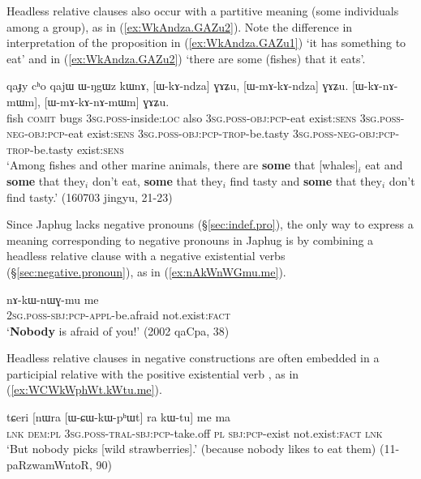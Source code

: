 Headless relative clauses also occur with a partitive meaning (some individuals among a group), as in (\ref{ex:WkAndza.GAZu2}). Note the difference in interpretation of the proposition  in (\ref{ex:WkAndza.GAZu1}) `it has something to eat' and in (\ref{ex:WkAndza.GAZu2}) `there are some (fishes) that it eats'.

\begin{exe}
\ex \label{ex:WkAndza.GAZu2}
\gll qaɟy cʰo qajɯ ɯ-ŋgɯz kɯnɤ, [ɯ-kɤ-ndza] ɣɤʑu, [ɯ-mɤ-kɤ-ndza] ɣɤʑu. [ɯ-kɤ-nɤ-mɯm], [ɯ-mɤ-kɤ-nɤ-mɯm] ɣɤʑu. \\
fish \textsc{comit} bugs \textsc{3sg}.\textsc{poss}-inside:\textsc{loc} also \textsc{3sg}.\textsc{poss}-\textsc{obj}:\textsc{pcp}-eat exist:\textsc{sens}  \textsc{3sg}.\textsc{poss}-\textsc{neg}-\textsc{obj}:\textsc{pcp}-eat exist:\textsc{sens} \textsc{3sg}.\textsc{poss}-\textsc{obj}:\textsc{pcp}-\textsc{trop}-be.tasty \textsc{3sg}.\textsc{poss}-\textsc{neg}-\textsc{obj}:\textsc{pcp}-\textsc{trop}-be.tasty exist:\textsc{sens}  \\
\glt `Among fishes and other marine animals, there are \textbf{some} that [whales]$_i$ eat and \textbf{some} that they$_i$ don't eat, \textbf{some} that they$_i$ find tasty and \textbf{some} that they$_i$ don't find tasty.' (160703 jingyu, 21-23)
\end{exe}

Since Japhug lacks negative pronouns (§\ref{sec:indef.pro}), the only way to express a meaning corresponding to negative pronouns in Japhug is by combining a headless relative clause with a negative existential verbs (§\ref{sec:negative.pronoun}), as in (\ref{ex:nAkWnWGmu.me}).

\begin{exe}
\ex \label{ex:nAkWnWGmu.me}
\gll nɤ-kɯ-nɯɣ-mu me \\
\textsc{2sg}.\textsc{poss}-\textsc{sbj}:\textsc{pcp}-\textsc{appl}-be.afraid not.exist:\textsc{fact} \\
\glt `\textbf{Nobody} is afraid of you!' (2002 qaCpa, 38)
\end{exe}


Headless relative clauses in negative constructions are often embedded in a participial relative with the positive existential verb , as in (\ref{ex:WCWkWphWt.kWtu.me}).

\begin{exe}
\ex \label{ex:WCWkWphWt.kWtu.me}
\gll tɕeri [nɯra [ɯ-ɕɯ-kɯ-pʰɯt] ra kɯ-tu] me ma \\
\textsc{lnk} \textsc{dem}:\textsc{pl} \textsc{3sg}.\textsc{poss}-\textsc{tral}-\textsc{sbj}:\textsc{pcp}-take.off \textsc{pl} \textsc{sbj}:\textsc{pcp}-exist not.exist:\textsc{fact} \textsc{lnk} \\
\glt `But nobody picks [wild strawberries].' (because nobody likes to eat them) (11-paRzwamWntoR, 90)
\end{exe}

